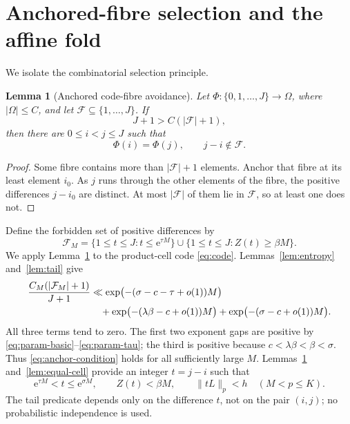 \documentclass[11pt]{article}
\newtheorem{lemma}[theorem]{Lemma}
\theoremstyle{remark}
\newcommand{\e}{\mathrm e}
\newcommand{\F}{\mathcal F}
\begin{document}
\section{Anchored-fibre selection and the affine fold}\label{sec:select}

We isolate the combinatorial selection principle.

\begin{lemma}[Anchored code-fibre avoidance]\label{lem:anchor}
Let \(\Phi:\{0,1,\ldots,J\}\to\Omega\), where
\(\lvert\Omega\rvert\leq C\), and let
\(\F\subseteq\{1,\ldots,J\}\).  If
\begin{equation}\label{eq:anchor-condition}
 J+1>C(\lvert\F\rvert+1),
\end{equation}
then there are \(0\leq i<j\leq J\) such that
\begin{equation}\label{eq:anchor-conclusion}
 \Phi(i)=\Phi(j),\qquad j-i\notin\F.
\end{equation}
\end{lemma}

\begin{proof}
Some fibre contains more than \(\lvert\F\rvert+1\) elements.  Anchor that
fibre at its least element \(i_0\).  As \(j\) runs through the other
elements of the fibre, the positive differences \(j-i_0\) are distinct.
At most \(\lvert\F\rvert\) of them lie in \(\F\), so at least one does not.
\end{proof}

Define the forbidden set of positive differences by
\begin{equation}\label{eq:forbidden}
 \F_M=
 \{1\leq t\leq J:t\leq\e^{\tau M}\}
 \mathbin{\cup}
 \{1\leq t\leq J:Z(t)\geq\beta M\}.
\end{equation}
We apply Lemma~\ref{lem:anchor} to the product-cell code
\eqref{eq:code}.  Lemmas~\ref{lem:entropy} and~\ref{lem:tail} give
\begin{align}
 \frac{C_M(\lvert\F_M\rvert+1)}{J+1}
 &\ll
 \exp\bigl(-(\sigma-c-\tau+o(1))M\bigr)\notag\\
 &\quad+
 \exp\bigl(-(\lambda\beta-c+o(1))M\bigr)
 +\exp\bigl(-(\sigma-c+o(1))M\bigr).
 \label{eq:forbidden-ratio}
\end{align}
All three terms tend to zero.  The first two exponent gaps are positive by
\eqref{eq:param-basic}--\eqref{eq:param-tau}; the third is positive because
\(c<\lambda\beta<\beta<\sigma\).  Thus
\eqref{eq:anchor-condition} holds for all sufficiently large \(M\).
Lemmas~\ref{lem:anchor} and~\ref{lem:equal-cell} provide an integer
\(t=j-i\) such that
\begin{equation}\label{eq:selected-t}
 \e^{\tau M}<t\leq\e^{\sigma M},
 \qquad
 Z(t)<\beta M,
 \qquad
 \|tL\|_p<h\quad(M<p\leq K).
\end{equation}
The tail predicate depends only on the difference \(t\), not on the pair
\((i,j)\); no probabilistic independence is used.
\end{document}
